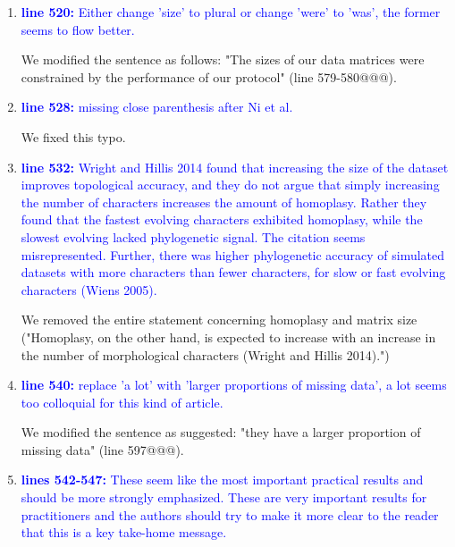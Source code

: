 \documentclass[12pt,letterpaper]{article}
\begin{document}
\begin{enumerate}
\item{\textcolor{blue}{\textbf{line 520:} Either change 'size' to plural or change 'were' to 'was', the former seems to flow better. }}

We modified the sentence as follows: "The sizes of our data matrices were constrained by the performance of our protocol" (line 579-580@@@).

\item{\textcolor{blue}{\textbf{line 528:} missing close parenthesis after Ni et al.}}

We fixed this typo.

\item{\textcolor{blue}{\textbf{line 532:} Wright and Hillis 2014 found that increasing the size of the dataset improves topological accuracy, and they do not argue that simply increasing the number of characters increases the amount of homoplasy. Rather they found that the fastest evolving characters exhibited homoplasy, while the slowest evolving lacked phylogenetic signal. The citation seems misrepresented. Further, there was higher phylogenetic accuracy of simulated datasets with more characters than fewer characters, for slow or fast evolving characters (Wiens 2005).}}

We removed the entire statement concerning homoplasy and matrix size ("Homoplasy, on the other hand, is expected to increase with an increase in the number of morphological characters (Wright and Hillis 2014).")

\item{\textcolor{blue}{\textbf{line 540:} replace 'a lot' with 'larger proportions of missing data', a lot seems too colloquial for this kind of article. }}

We modified the sentence as suggested: "they have a larger proportion of missing data" (line 597@@@).

\item{\textcolor{blue}{\textbf{lines 542-547:} These seem like the most important practical results and should be more strongly emphasized. These are very important results for practitioners and the authors should try to make it more clear to the reader that this is a key take-home message.}}


\end{enumerate}
\end{document}

